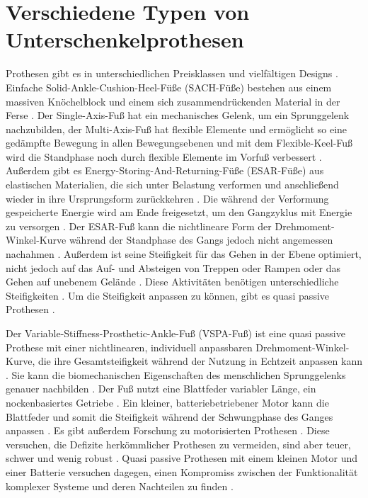 \section{Verschiedene Typen von Unterschenkelprothesen} %
Prothesen gibt es in unterschiedlichen Preisklassen und vielfältigen Designs \cite{Stevens.2018}.
Einfache Solid-Ankle-Cushion-Heel-Füße (SACH-Füße) bestehen aus einem massiven Knöchelblock und einem sich zusammendrückenden Material in der Ferse \cite{Stevens.2018}. Der Single-Axis-Fuß hat ein mechanisches Gelenk, um ein Sprunggelenk nachzubilden, der Multi-Axis-Fuß hat flexible Elemente und ermöglicht so eine gedämpfte Bewegung in allen Bewegungsebenen und mit dem Flexible-Keel-Fuß wird die Standphase noch durch flexible Elemente im Vorfuß verbessert \cite{Stevens.2018}.
Außerdem gibt es Energy-Storing-And-Returning-Füße (ESAR-Füße) aus elastischen Materialien, die sich unter Belastung verformen und anschließend wieder in ihre Ursprungsform zurückkehren \cite{Stevens.2018}. Die während der Verformung gespeicherte Energie wird am Ende freigesetzt, um den Gangzyklus mit Energie zu versorgen \cite{Stevens.2018}.
Der ESAR-Fuß kann die nichtlineare Form der Drehmoment-Winkel-Kurve während der Standphase des Gangs jedoch nicht angemessen nachahmen \cite{Shepherd.2017}. Außerdem ist seine Steifigkeit für das Gehen in der Ebene optimiert, nicht jedoch auf das Auf- und Absteigen von Treppen oder Rampen oder das Gehen auf unebenem Gelände \cite{Shepherd.2017}. Diese Aktivitäten benötigen unterschiedliche Steifigkeiten \cite{Shepherd.2017}. Um die Steifigkeit anpassen zu können, gibt es quasi passive Prothesen \cite{Shepherd.2017}.

Der Variable-Stiffness-Prosthetic-Ankle-Fuß (VSPA-Fuß) ist eine quasi passive Prothese mit einer nichtlinearen, individuell anpassbaren Drehmoment-Winkel-Kurve, die ihre Gesamtsteifigkeit während der Nutzung in Echtzeit anpassen kann \cite{Shepherd.2017}. Sie kann die biomechanischen Eigenschaften des menschlichen Sprunggelenks genauer nachbilden \cite{Shepherd.2017}. Der Fuß nutzt eine Blattfeder variabler Länge, ein nockenbasiertes Getriebe \cite{Shetty.2022}. Ein kleiner, batteriebetriebener Motor kann die Blattfeder und somit die Steifigkeit während der Schwungphase des Ganges anpassen \cite{Shetty.2022}. %
Es gibt außerdem Forschung zu motorisierten Prothesen \cite{Shetty.2022}. Diese versuchen, die Defizite herkömmlicher Prothesen zu vermeiden, sind aber teuer, schwer und wenig robust \cite{Shetty.2022}. Quasi passive Prothesen mit einem kleinen Motor und einer Batterie versuchen dagegen, einen Kompromiss zwischen der Funktionalität komplexer Systeme und deren Nachteilen zu finden \cite{Shetty.2022}.

